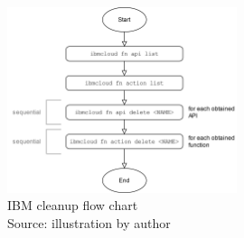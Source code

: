 \begin{figure}[htp]
\begin{center}
\includegraphics[width=0.6\textwidth]{bilder/IBM_Cleanup_Flow.png}
\captionsetup{justification=centering, labelfont=bf}
\caption[IBM cleanup flow chart]{IBM cleanup flow chart\\Source: illustration by author}
\label{fig:ibm_cleanup}
\end{center}
\end{figure}


